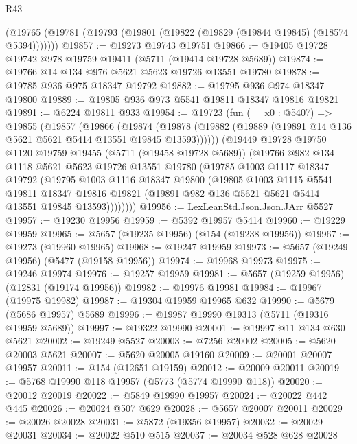 \begin{lexlean}{R43}
\begin{coremodule}
    (@19765 (@19781 (@19793 (@19801 (@19822 (@19829 (@19844 @19845) (@18574 @5394)))))))
@19857 := @19273 @19743 @19751
@19866 := @19405 @19728 @19742 @978 @19759 @19411 (@5711 (@19414 @19728 @5689))
@19874 := @19766 @14 @134 @976 @5621 @5623 @19726 @13551 @19780
@19878 := @19785 @936 @975 @18347 @19792
@19882 := @19795 @936 @974 @18347 @19800
@19889 := @19805 @936 @973 @5541 @19811 @18347 @19816 @19821
@19891 := @6224 @19811 @933
@19954 := @19723
    (fun (__x0 : @5407) =>
    @19855
      (@19857
        (@19866
          (@19874
            (@19878 (@19882 (@19889 (@19891 @14 @136 @5621 @5621 @5414 @13551 @19845 @13593))))))
        (@19449
          @19728
          @19750
          @1120
          @19759
          @19455
          (@5711 (@19458 @19728 @5689))
          (@19766
            @982
            @134
            @1118
            @5621
            @5623
            @19726
            @13551
            @19780
            (@19785
              @1003
              @1117
              @18347
              @19792
              (@19795
                @1003
                @1116
                @18347
                @19800
                (@19805
                  @1003
                  @1115
                  @5541
                  @19811
                  @18347
                  @19816
                  @19821
                  (@19891 @982 @136 @5621 @5621 @5414 @13551 @19845 @13593))))))))
@19956 := LexLeanStd.Json.Json.JArr @5527
@19957 := @19230 @19956
@19959 := @5392 @19957 @5414
@19960 := @19229 @19959
@19965 := @5657 (@19235 @19956) (@154 (@19238 @19956))
@19967 := @19273 (@19960 @19965)
@19968 := @19247 @19959
@19973 := @5657 (@19249 @19956) (@5477 (@19158 @19956))
@19974 := @19968 @19973
@19975 := @19246 @19974
@19976 := @19257 @19959
@19981 := @5657 (@19259 @19956) (@12831 (@19174 @19956))
@19982 := @19976 @19981
@19984 := @19967 (@19975 @19982)
@19987 := @19304 @19959 @19965 @632
@19990 := @5679 (@5686 @19957) @5689
@19996 := @19987 @19990 @19313 (@5711 (@19316 @19959 @5689))
@19997 := @19322 @19990
@20001 := @19997 @11 @134 @630 @5621
@20002 := @19249 @5527
@20003 := @7256 @20002
@20005 := @5620 @20003 @5621
@20007 := @5620 @20005 @19160
@20009 := @20001 @20007 @19957
@20011 := @154 (@12651 @19159)
@20012 := @20009 @20011
@20019 := @5768 @19990 @118 @19957 (@5773 (@5774 @19990 @118))
@20020 := @20012 @20019
@20022 := @5849 @19990 @19957
@20024 := @20022 @442 @445
@20026 := @20024 @507 @629
@20028 := @5657 @20007 @20011
@20029 := @20026 @20028
@20031 := @5872 (@19356 @19957)
@20032 := @20029 @20031
@20034 := @20022 @510 @515
@20037 := @20034 @528 @628 @20028

\end{coremodule}
\end{lexlean}
